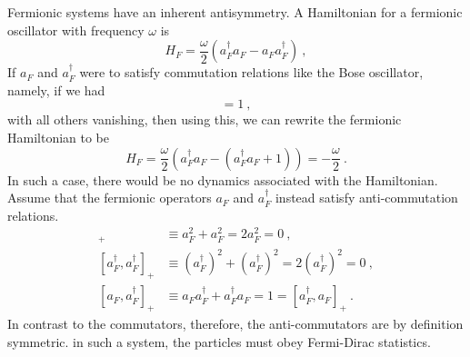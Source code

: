 \documentclass[11pt,a4paper]{article}
\begin{document}
Fermionic systems have an inherent antisymmetry. A Hamiltonian for a fermionic oscillator with frequency $\omega$ is
\begin{equation}
H_F = \dfrac{\omega}{2} \left(a_F^\dagger a_F -a_F a_F^\dagger \right) ~,
\end{equation}
If $a_F$ and $a_F^\dagger$ were to satisfy commutation relations like the Bose oscillator, namely, if we had
\begin{equation}
[a_F, a_F^\dagger] = 1 ~,
\end{equation}
with all others vanishing, then using this, we can rewrite the fermionic Hamiltonian to be
\begin{equation}
H_F = \dfrac{\omega}{2} \left(a_F^\dagger a_F -\left(a_F^\dagger a_F +1 \right) \right) = -\dfrac{\omega}{2} ~.
\end{equation}
In such a case, there would be no dynamics associated with the Hamiltonian. Assume that the fermionic operators $a_F$ and $a_F^\dagger$ instead satisfy anti-commutation relations.
\begin{align}
[a_F, a_F]_+ &\equiv a_F^2 +a_F^2 = 2a_F^2 = 0 ~, \\
[a_F^\dagger, a_F^\dagger]_+ &\equiv (a_F^\dagger)^2 +(a_F^\dagger)^2 = 2(a_F^\dagger)^2 = 0 ~, \\
[a_F, a_F^\dagger]_+ &\equiv a_F a_F^\dagger +a_F^\dagger a_F = 1 = [a_F^\dagger, a_F]_+ ~.
\end{align}
In contrast to the commutators, therefore, the anti-commutators are by definition symmetric. in such a system, the particles must obey Fermi-Dirac statistics.


































\end{document}
